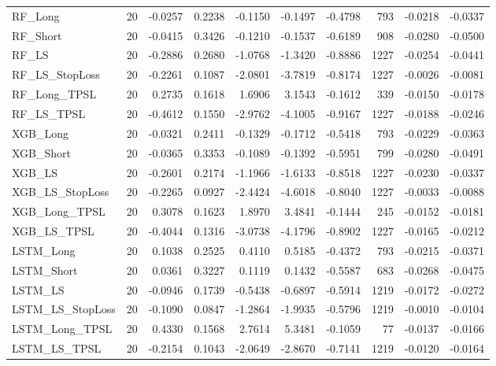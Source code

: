 \begin{tabular}{llrrrrrrrr}
\cline{1-10}
RF\_Long & 20 & -0.0257 & 0.2238 & -0.1150 & -0.1497 & -0.4798 & 793 & -0.0218 & -0.0337 \\
\cline{1-10}
RF\_Short & 20 & -0.0415 & 0.3426 & -0.1210 & -0.1537 & -0.6189 & 908 & -0.0280 & -0.0500 \\
\cline{1-10}
RF\_LS & 20 & -0.2886 & 0.2680 & -1.0768 & -1.3420 & -0.8886 & 1227 & -0.0254 & -0.0441 \\
\cline{1-10}
RF\_LS\_StopLoss & 20 & -0.2261 & 0.1087 & -2.0801 & -3.7819 & -0.8174 & 1227 & -0.0026 & -0.0081 \\
\cline{1-10}
RF\_Long\_TPSL & 20 & 0.2735 & 0.1618 & 1.6906 & 3.1543 & -0.1612 & 339 & -0.0150 & -0.0178 \\
\cline{1-10}
RF\_LS\_TPSL & 20 & -0.4612 & 0.1550 & -2.9762 & -4.1005 & -0.9167 & 1227 & -0.0188 & -0.0246 \\
\cline{1-10}
XGB\_Long & 20 & -0.0321 & 0.2411 & -0.1329 & -0.1712 & -0.5418 & 793 & -0.0229 & -0.0363 \\
\cline{1-10}
XGB\_Short & 20 & -0.0365 & 0.3353 & -0.1089 & -0.1392 & -0.5951 & 799 & -0.0280 & -0.0491 \\
\cline{1-10}
XGB\_LS & 20 & -0.2601 & 0.2174 & -1.1966 & -1.6133 & -0.8518 & 1227 & -0.0230 & -0.0337 \\
\cline{1-10}
XGB\_LS\_StopLoss & 20 & -0.2265 & 0.0927 & -2.4424 & -4.6018 & -0.8040 & 1227 & -0.0033 & -0.0088 \\
\cline{1-10}
XGB\_Long\_TPSL & 20 & 0.3078 & 0.1623 & 1.8970 & 3.4841 & -0.1444 & 245 & -0.0152 & -0.0181 \\
\cline{1-10}
XGB\_LS\_TPSL & 20 & -0.4044 & 0.1316 & -3.0738 & -4.1796 & -0.8902 & 1227 & -0.0165 & -0.0212 \\
\cline{1-10}
LSTM\_Long & 20 & 0.1038 & 0.2525 & 0.4110 & 0.5185 & -0.4372 & 793 & -0.0215 & -0.0371 \\
\cline{1-10}
LSTM\_Short & 20 & 0.0361 & 0.3227 & 0.1119 & 0.1432 & -0.5587 & 683 & -0.0268 & -0.0475 \\
\cline{1-10}
LSTM\_LS & 20 & -0.0946 & 0.1739 & -0.5438 & -0.6897 & -0.5914 & 1219 & -0.0172 & -0.0272 \\
\cline{1-10}
LSTM\_LS\_StopLoss & 20 & -0.1090 & 0.0847 & -1.2864 & -1.9935 & -0.5796 & 1219 & -0.0010 & -0.0104 \\
\cline{1-10}
LSTM\_Long\_TPSL & 20 & 0.4330 & 0.1568 & 2.7614 & 5.3481 & -0.1059 & 77 & -0.0137 & -0.0166 \\
\cline{1-10}
LSTM\_LS\_TPSL & 20 & -0.2154 & 0.1043 & -2.0649 & -2.8670 & -0.7141 & 1219 & -0.0120 & -0.0164 \\
\cline{1-10}
\bottomrule
\end{tabular}
